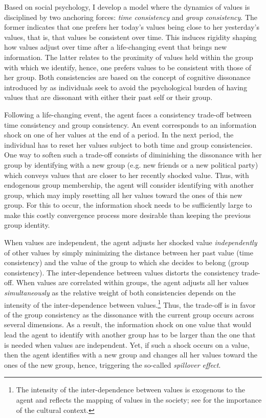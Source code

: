 Based on social psychology, I develop a model where the dynamics of values is disciplined by two anchoring forces: \textit{time consistency} and \textit{group consistency}. 
The former indicates that one prefers her today's values being close to her yesterday's values, that is, that values be consistent over time. This induces rigidity shaping how values adjust over time after a life-changing event that brings new information. 
The latter relates to the proximity of values held within the group with which we identify, hence, one prefers values to be consistent with those of her group. 
Both consistencies are based on the concept of cognitive dissonance introduced by \citet{Festinger1957Theory} as individuals seek to avoid the psychological burden of having values that are dissonant with either their past self or their group.

Following a life-changing event, the agent faces a consistency trade-off between time consistency and group consistency. An event corresponds to an information shock on one of her values at the end of a period. 
In the next period, the individual has to reset her values subject to both time and group consistencies. 
One way to soften such a trade-off consists of diminishing the dissonance with her group by identifying with a new group (e.g. new friends or a new political party) which conveys values that are closer to her recently shocked value.
Thus, with endogenous group membership, the agent will consider identifying with another group, which may imply resetting all her values toward the ones of this new group. 
For this to occur, the information shock needs to be sufficiently large to make this costly convergence process more desirable than keeping the previous group identity.

When values are independent, the agent adjusts her shocked value \textit{independently} of other values by simply minimizing the distance between her past value (time consistency) and the value of the group to which she decides to belong (group consistency).
The inter-dependence between values distorts the consistency trade-off.
When values are correlated within groups, the agent adjusts all her values \textit{simultaneously} as the relative weight of both consistencies depends on the intensity of the inter-dependence between values.\footnote{The intensity of the inter-dependence between values is exogenous to the agent and reflects the mapping of values in the society; see \citet{Roccas2010Personal} for the importance of the cultural context.}
Thus, the trade-off is in favor of the group consistency as the dissonance with the current group occurs across several dimensions.
As a result, the information shock on one value that would lead the agent to identify with another group has to be larger than the one that is needed when values are independent. 
Yet, if such a shock occurs on a value, then the agent identifies with a new group and changes all her values toward the ones of the new group, hence, triggering the so-called \textit{spillover effect}.

